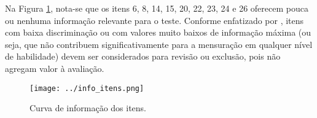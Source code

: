 Na Figura \ref{fig:info_itens}, nota-se que os itens 6, 8, 14, 15, 20, 22, 23, 24 e 26 oferecem pouca ou nenhuma informação relevante para o teste. Conforme enfatizado por , itens com baixa discriminação ou com valores muito baixos de informação máxima (ou seja, que não contribuem significativamente para a mensuração em qualquer nível de habilidade) devem ser considerados para revisão ou exclusão, pois não agregam valor à avaliação.



\begin{figure}[!ht]
	\centering
	\caption{Curva de informação dos itens.}
	\texttt{[image: ../info\_itens.png]}
	\parbox{\textwidth}{
		\centering %
	}
	\label{fig:info_itens}
\end{figure}

